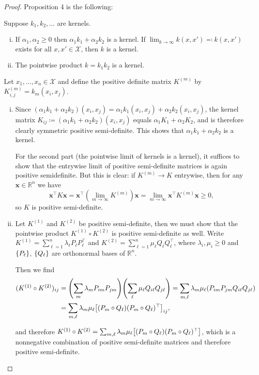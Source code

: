 \documentclass{article}
\theoremstyle{plain}
\theoremstyle{remark}
\renewcommand{\vec}{\mathbf}
\newcommand{\Bb}{\mathbb}
\newcommand{\Cal}{\mathcal}
\newcommand{\RR}{\Bb R}
\newcommand{\T}{^\top} %
\newcommand\ceq\coloneqq %
\begin{document}
\begin{proof}
	Proposition 4 is the following:
	\begin{mdframed}
		Suppose $k_1, k_2, \dotsc$ are kernels. 
		\begin{enumerate}[(i)]
			\item If $\alpha_1, \alpha_2 \geq 0$ then $\alpha_1 k_1 + \alpha_2 k_2$ is a kernel. If $\lim_{k\to\infty} k(x, x') \eqqcolon k(x, x')$ exists for all $x, x' \in \Cal X$, then $k$ is a kernel. 
			\item The pointwise product $k = k_1k_2$ is a kernel.
		\end{enumerate}
	\end{mdframed}

Let $x_1, \dotsc, x_n \in \Cal X$ and define the positive definite matrix $K^{(m)}$ by $K^{(m)}_{i, j} = k_m(x_i, x_j)$. 
\begin{enumerate}[(i)]
	\item Since $(\alpha_1 k_1 + \alpha_2 k_2)(x_i, x_j) = \alpha_1 k_1(x_i, x_j) + \alpha_2 k_2(x_i, x_j)$, the kernel matrix $K_{ij} \ceq (\alpha_1 k_1 + \alpha_2 k_2)(x_i, x_j)$ equals $\alpha_1 K_1 + \alpha_2 K_2$, and is therefore clearly symmetric positive semi-definite. This shows that $\alpha_1 k_1 + \alpha_2 k_2$ is a kernel. 
	
	For the second part (the pointwise limit of kernels is a kernel), it suffices to show that the entrywise limit of positive semi-definite matrices is again positive semidefinite. But this is clear: if $K^{(m)} \to K$ entrywise, then for any $\vec x \in \RR^n$ we have
	\[
	\vec x\T K \vec x = \vec x\T (\lim_{m\to\infty} K^{(m)}) \vec x = \lim_{m\to\infty} \vec x\T K^{(m)}\vec x \geq 0,
	\]
	so $K$ is positive semi-definite.
	
	\item Let $K^{(1)}$ and $K^{(2)}$ be positive semi-definite, then we must show that the pointwise product $K^{(1)} \circ K^{(2)}$ is positive semi-definite as well. Write $K^{(1)} = \sum_{\ell=1}^n \lambda_\ell P_\ell P_\ell\T$ and $K^{(2)} = \sum_{\ell=1}^n \mu_\ell Q_\ell Q_\ell\T$, where $\lambda_i, \mu_i \geq 0$ and $\qty{P_\ell}$, $\qty{Q_\ell}$ are orthonormal bases of $\RR^n$. 
	
	Then we find
	\begin{align*}
	(K^{(1)} \circ K^{(2)})_{ij} &= \qty(\sum_m \lambda_m P_{im} P_{jm}) \qty(\sum_\ell \mu_\ell Q_{i\ell} Q_{j\ell}) = \sum_{m, \ell} \lambda_m \mu_\ell (P_{im} P_{jm} Q_{i\ell} Q_{j\ell}) \\
	&= \sum_{m, \ell} \lambda_m \mu_\ell \qty[(P_m \circ Q_\ell)(P_m \circ Q_\ell)\T]_{ij},
	\end{align*}
	
	and therefore $K^{(1)} \circ K^{(2)} = \sum_{m, \ell} \lambda_m \mu_\ell \qty[(P_m \circ Q_\ell)(P_m \circ Q_\ell)\T]$, which is a nonnegative combination of positive semi-definite matrices and therefore positive semi-definite. 
\end{enumerate}
\end{proof}
\end{document}
